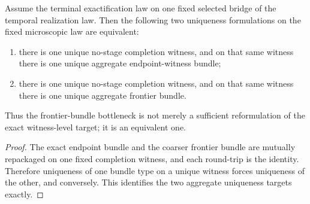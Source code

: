 \begin{theorem}
\label{thm:canonical-completion-witness-bundle-target-iff-canonical-completion-witness-frontier-bundle-target}
Assume the terminal exactification law on one fixed selected bridge of the
temporal realization law. Then the following two uniqueness formulations on
the fixed microscopic law are equivalent:
\begin{enumerate}
\item there is one unique no-stage completion witness, and on that same witness
there is one unique aggregate endpoint-witness bundle;
\item there is one unique no-stage completion witness, and on that same witness
there is one unique aggregate frontier bundle.
\end{enumerate}
Thus the frontier-bundle bottleneck is not merely a sufficient reformulation of
the exact witness-level target; it is an equivalent one.
\end{theorem}

\begin{proof}
The exact endpoint bundle and the coarser frontier bundle are mutually
repackaged on one fixed completion witness, and each round-trip is the
identity. Therefore uniqueness of one bundle type on a unique witness forces
uniqueness of the other, and conversely. This identifies the two aggregate
uniqueness targets exactly.
\end{proof}

